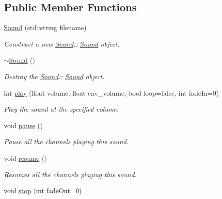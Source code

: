 \subsection*{Public Member Functions}
\begin{DoxyCompactItemize}
\item 
\hyperlink{class_sound_a33747a0bca54f777d0da6f300b8f23f0}{Sound} (std\+::string filename)
\begin{DoxyCompactList}\small\item\em Construct a new \hyperlink{class_sound}{Sound}\+:\+: \hyperlink{class_sound}{Sound} object. \end{DoxyCompactList}\item 
\mbox{\label{class_sound_a0907389078bf740be2a5763366ad3376}} 
\hyperlink{class_sound_a0907389078bf740be2a5763366ad3376}{$\sim$\+Sound} ()
\begin{DoxyCompactList}\small\item\em Destroy the \hyperlink{class_sound}{Sound}\+:\+: \hyperlink{class_sound}{Sound} object. \end{DoxyCompactList}\item 
int \hyperlink{class_sound_ad5edcf094481b5b2f5e12451a4c99a13}{play} (float volume, float env\+\_\+volume, bool loop=false, int fade\+In=0)
\begin{DoxyCompactList}\small\item\em Play the sound at the specified volume. \end{DoxyCompactList}\item 
\mbox{\label{class_sound_a65b0f66e9123caed2809da366ac4d377}} 
void \hyperlink{class_sound_a65b0f66e9123caed2809da366ac4d377}{pause} ()
\begin{DoxyCompactList}\small\item\em Pause all the channels playing this sound. \end{DoxyCompactList}\item 
\mbox{\label{class_sound_a6139aff26f5bd3fea27fbef013124afc}} 
void \hyperlink{class_sound_a6139aff26f5bd3fea27fbef013124afc}{resume} ()
\begin{DoxyCompactList}\small\item\em Resumes all the channels playing this sound. \end{DoxyCompactList}\item 
void \hyperlink{class_sound_a67d1d3e523a556d9396d7ec29f038a7b}{stop} (int fade\+Out=0)

\end{DoxyCompactItemize}
